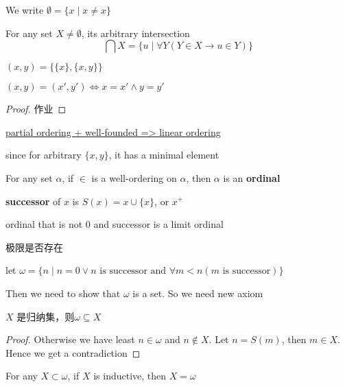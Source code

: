 \documentclass[11pt]{article}
\begin{document}
We write \(\emptyset=\{x\mid x\neq x\}\)

For any set \(X\neq\emptyset\), its arbitrary intersection
\begin{equation*}
\bigcap X=\{u\mid\forall Y(Y\in X\to u\in Y)\}
\end{equation*}

\begin{definition}[]
\((x,y)=\{\{x\},\{x,y\}\}\)
\end{definition}

\begin{proposition}[]
\((x,y)=(x',y')\Leftrightarrow x=x'\wedge y=y'\)
\end{proposition}

\begin{proof}
作业
\end{proof}


\uline{partial ordering + well-founded => linear ordering}

since for arbitrary \(\{x,y\}\), it has a minimal element

\begin{definition}[]
For any set \(\alpha\), if \(\in\) is a well-ordering on \(\alpha\), then \(\alpha\) is an \textbf{ordinal}
\end{definition}

\begin{definition}[]
\textbf{successor} of \(x\) is \(S(x)=x\cup\{x\}\), or \(x^+\)
\end{definition}

ordinal that is not 0 and successor is a limit ordinal

极限是否存在

let \(\omega=\{n\mid n=0\vee n\text{ is successor and }\forall m<n(m\text{ is successor})\}\)

Then we need to show that \(\omega\) is a set. So we need new axiom

\begin{proposition}[]
\(X\) 是归纳集，则\(\omega\subseteq X\)
\end{proposition}

\begin{proof}
Otherwise we have least \(n\in\omega\) and \(n\not\in X\). Let \(n=S(m)\), then \(m\in X\). Hence we get a contradiction
\end{proof}

\begin{theorem}[]
For any \(X\subset\omega\), if \(X\) is inductive, then \(X=\omega\)
\end{theorem}
\end{document}
